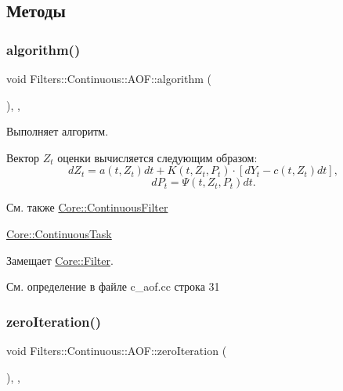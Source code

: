\subsection{Методы}
\hypertarget{class_filters_1_1_continuous_1_1_a_o_f_af25cf723db57bba9d52173b27f960170}{}\label{class_filters_1_1_continuous_1_1_a_o_f_af25cf723db57bba9d52173b27f960170} 
\subsubsection{\texorpdfstring{algorithm()}{algorithm()}}
{\footnotesize\ttfamily void Filters\+::\+Continuous\+::\+A\+O\+F\+::algorithm (\begin{DoxyParamCaption}{ }\end{DoxyParamCaption})\hspace{0.3cm}{\ttfamily [override]}, {\ttfamily [protected]}, {\ttfamily [virtual]}}



Выполняет алгоритм. 

Вектор $Z_t$ оценки вычисляется следующим образом\+: \[dZ_t = a(t,Z_t)dt + K(t,Z_t, P_t)\cdot [ dY_t - c(t,Z_t)dt],\] \[dP_t = \Psi(t,Z_t,P_t)dt.\]

\begin{DoxySeeAlso}{См. также}
\hyperlink{class_core_1_1_continuous_filter}{Core\+::\+Continuous\+Filter} 

\hyperlink{class_core_1_1_continuous_task}{Core\+::\+Continuous\+Task} 
\end{DoxySeeAlso}


Замещает \hyperlink{class_core_1_1_filter_a438681ee3e54aba2148042d9f8011ab8}{Core\+::\+Filter}.



См. определение в файле c\+\_\+aof.\+cc строка 31

\hypertarget{class_filters_1_1_continuous_1_1_a_o_f_ab416b56dbeb26366f495f03b3c08ad5e}{}\label{class_filters_1_1_continuous_1_1_a_o_f_ab416b56dbeb26366f495f03b3c08ad5e} 
\subsubsection{\texorpdfstring{zero\+Iteration()}{zeroIteration()}}
{\footnotesize\ttfamily void Filters\+::\+Continuous\+::\+A\+O\+F\+::zero\+Iteration (\begin{DoxyParamCaption}{ }\end{DoxyParamCaption})\hspace{0.3cm}{\ttfamily [override]}, {\ttfamily [protected]}, {\ttfamily [virtual]}}



